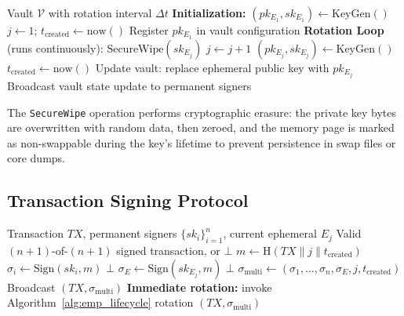 \documentclass[12pt, a4paper, twocolumn]{article}
\begin{document}
\begin{algorithm}[H]
\caption{EMP Key Lifecycle}
\label{alg:emp_lifecycle}
\begin{algorithmic}[1]
\REQUIRE Vault $\mathcal{V}$ with rotation interval $\Delta t$
\STATE \textbf{Initialization:}
\STATE $(pk_{E_1}, sk_{E_1}) \leftarrow \text{KeyGen}()$
\STATE $j \leftarrow 1$; \quad $t_{\text{created}} \leftarrow \text{now}()$
\STATE Register $pk_{E_1}$ in vault configuration
\STATE
\STATE \textbf{Rotation Loop} (runs continuously):
\LOOP
    \STATE $\text{SecureWipe}(sk_{E_j})$ 
    \STATE $j \leftarrow j + 1$
    \STATE $(pk_{E_j}, sk_{E_j}) \leftarrow \text{KeyGen}()$ 
    \STATE $t_{\text{created}} \leftarrow \text{now}()$
    \STATE Update vault: replace ephemeral public key with $pk_{E_j}$
    \STATE Broadcast vault state update to permanent signers
  \ENDIF
\ENDLOOP
\end{algorithmic}
\end{algorithm}

The \texttt{SecureWipe} operation performs cryptographic erasure: the private key bytes are overwritten with random data, then zeroed, and the memory page is marked as non-swappable during the key's lifetime to prevent persistence in swap files or core dumps.

\subsection{Transaction Signing Protocol}

\begin{algorithm}[H]
\caption{EMP Transaction Signing}
\label{alg:emp_sign}
\begin{algorithmic}[1]
\REQUIRE Transaction $TX$, permanent signers $\{sk_i\}_{i=1}^{n}$, current ephemeral $E_j$
\ENSURE Valid $(n+1)$-of-$(n+1)$ signed transaction, or $\bot$
\STATE $m \leftarrow \text{H}(TX \| j \| t_{\text{created}})$ 
  \STATE $\sigma_i \leftarrow \text{Sign}(sk_i, m)$ 
    \RETURN $\bot$ 
  \ENDIF
\ENDFOR
\STATE $\sigma_{E} \leftarrow \text{Sign}(sk_{E_j}, m)$ 
  \RETURN $\bot$
\ENDIF
\STATE $\sigma_{\text{multi}} \leftarrow (\sigma_1, \ldots, \sigma_n, \sigma_E, j, t_{\text{created}})$
\STATE Broadcast $(TX, \sigma_{\text{multi}})$
\STATE \textbf{Immediate rotation:} invoke Algorithm~\ref{alg:emp_lifecycle} rotation
\RETURN $(TX, \sigma_{\text{multi}})$
\end{algorithmic}
\end{algorithm}
\end{document}
